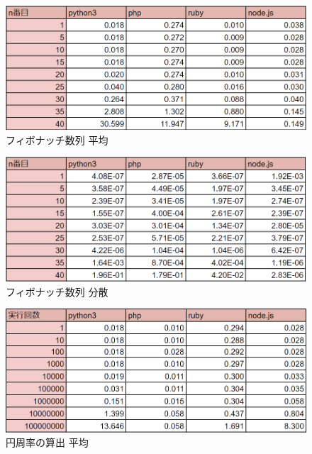 \clearpage
\begin{figure}[tb]
    \centering
    \includegraphics[width=14.5cm,keepaspectratio]{figure/f-average.PNG}
    \caption{フィボナッチ数列 平均}
    \label{fig:f-average}
\end{figure}

\begin{figure}[tb]
    \centering
    \includegraphics[width=14.5cm,keepaspectratio]{figure/f-dispersion.PNG}
    \caption{フィボナッチ数列 分散}
    \label{fig:f-dispersion}
\end{figure}

\clearpage

\begin{figure}[tb]
    \centering
    \includegraphics[width=14.5cm,keepaspectratio]{figure/p-average.PNG}
    \caption{円周率の算出 平均}
    \label{fig:p-average}
\end{figure}

